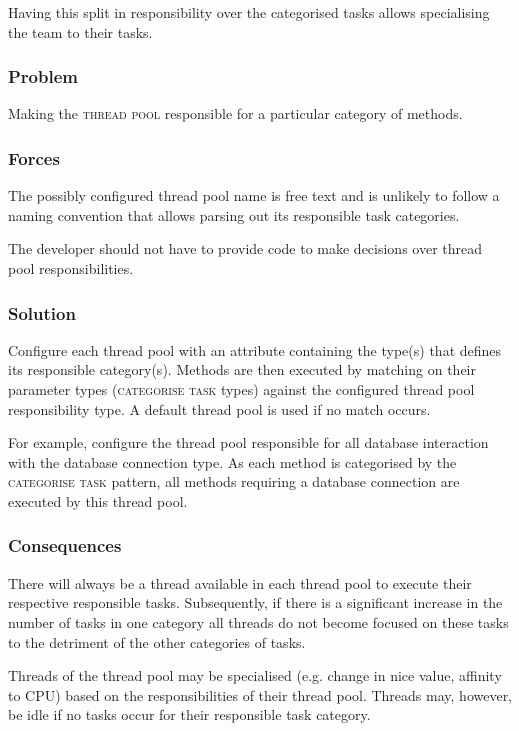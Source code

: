 \documentclass[prodmode]{style/acmlarge}
\begin{document}
Having this split in responsibility over the categorised tasks allows
specialising the team to their tasks.

\subsubsection*{Problem} Making the \textsc{thread pool} responsible for a
particular category of methods.

\subsubsection*{Forces} The possibly configured thread pool name is free text
and is unlikely to follow a naming convention that allows parsing out its
responsible task categories.

The developer should not have to provide code to make decisions over thread pool
responsibilities.

\subsubsection*{Solution} Configure each thread pool with an attribute
containing the type(s) that defines its responsible category(s).  Methods are
then executed by matching on their parameter types (\textsc{categorise task}
types) against the configured thread pool responsibility type.  A default thread
pool is used if no match occurs.

For example, configure the thread pool responsible for all database interaction
with the database connection type.  As each method is categorised by the
\textsc{categorise task} pattern, all methods requiring a database connection
are executed by this thread pool.

\subsubsection*{Consequences} There will always be a thread available in each
thread pool to execute their respective responsible tasks.  Subsequently, if
there is a significant increase in the number of tasks in one category all
threads do not become focused on these tasks to the detriment of the other
categories of tasks.

Threads of the thread pool may be specialised (e.g. change in nice value,
affinity to CPU) based on the responsibilities of their thread pool.  Threads
may, however, be idle if no tasks occur for their responsible task category.
\end{document}
